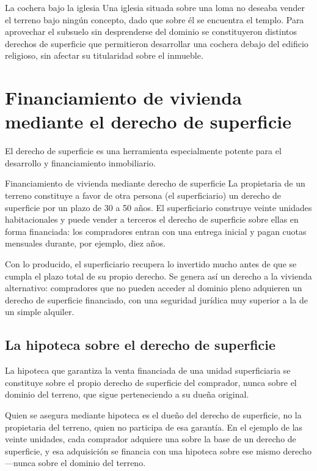\documentclass[12pt,oneside]{book}
\begin{document}
\begin{example}{La cochera bajo la iglesia}
Una iglesia situada sobre una loma no deseaba vender el terreno bajo ningún concepto, dado que sobre él se encuentra el templo. Para aprovechar el subsuelo sin desprenderse del dominio se constituyeron distintos derechos de superficie que permitieron desarrollar una cochera debajo del edificio religioso, sin afectar su titularidad sobre el inmueble.
\end{example}

\section{Financiamiento de vivienda mediante el derecho de superficie}
\label{sec:financiamiento}

El derecho de superficie es una herramienta especialmente potente para el desarrollo y financiamiento inmobiliario.

\begin{example}{Financiamiento de vivienda mediante derecho de superficie}
La propietaria de un terreno constituye a favor de otra persona (el superficiario) un derecho de superficie por un plazo de 30 a 50 años. El superficiario construye veinte unidades habitacionales y puede vender a terceros el derecho de superficie sobre ellas en forma financiada: los compradores entran con una entrega inicial y pagan cuotas mensuales durante, por ejemplo, diez años.

Con lo producido, el superficiario recupera lo invertido mucho antes de que se cumpla el plazo total de su propio derecho. Se genera así un derecho a la vivienda alternativo: compradores que no pueden acceder al dominio pleno adquieren un derecho de superficie financiado, con una seguridad jurídica muy superior a la de un simple alquiler.
\end{example}

\subsection{La hipoteca sobre el derecho de superficie}

La hipoteca que garantiza la venta financiada de una unidad superficiaria se constituye sobre el propio derecho de superficie del comprador, nunca sobre el dominio del terreno, que sigue perteneciendo a su dueña original.

\begin{important}
Quien se asegura mediante hipoteca es el dueño del derecho de superficie, no la propietaria del terreno, quien no participa de esa garantía. En el ejemplo de las veinte unidades, cada comprador adquiere una sobre la base de un derecho de superficie, y esa adquisición se financia con una hipoteca sobre ese mismo derecho ---nunca sobre el dominio del terreno.
\end{important}
\end{document}
